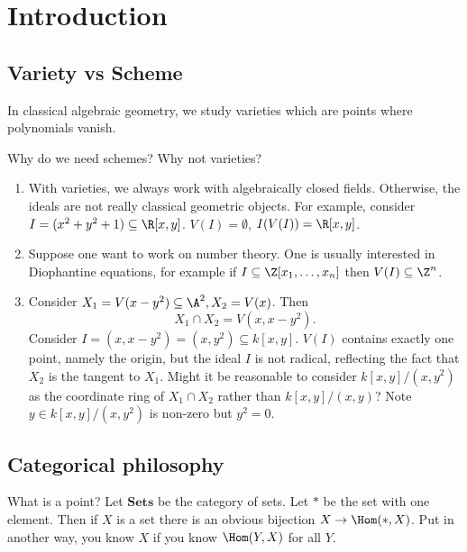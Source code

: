 \documentclass[a4paper]{article}
\renewcommand{\c}[1]{\mathbf{#1}} %
\begin{document}


\tableofcontents

\setcounter{section}{-1}

\section{Introduction}

\subsection{Variety vs Scheme}

In classical algebraic geometry, we study varieties which are points where polynomials vanish.

Why do we need schemes? Why not varieties?
\begin{enumerate}
\item With varieties, we always work with algebraically closed fields. Otherwise, the ideals are not really classical geometric objects. For example, consider \(I = (x^2 + y^2 + 1) \subseteq \R[x, y]\). \(V(I) = \emptyset\), \(I(V(I)) = \R[x, y]\).
\item Suppose one want to work on number theory. One is usually interested in Diophantine equations, for example if \(I \subseteq \Z[x_1, \dots, x_n]\) then \(V(I) \subseteq \Z^n\). 
\item Consider \(X_1 = V(x - y^2) \subseteq \A^2, X_2 = V(x)\). Then
  \[
    X_1 \cap X_2 = V(x, x - y^2).
  \]
  Consider \(I = (x, x - y^2) = (x, y^2) \subseteq k[x, y]\). \(V(I)\) contains exactly one point, namely the origin, but the ideal \(I\) is not radical, reflecting the fact that \(X_2\) is the tangent to \(X_1\). Might it be reasonable to consider \(k[x, y]/(x, y^2)\) as the coordinate ring of \(X_1 \cap X_2\) rather than \(k[x, y]/(x, y)\)? Note \(y \in k[x, y]/(x, y^2)\) is non-zero but \(y^2 = 0\).
\end{enumerate}

\subsection{Categorical philosophy}

What is a point? Let \(\c{Sets}\) be the category of sets. Let \(*\) be the set with one element. Then if \(X\) is a set there is an obvious bijection \(X \to \Hom(*, X)\). Put in another way, you know \(X\) if you know \(\Hom(Y, X)\) for all \(Y\).
\end{document}
